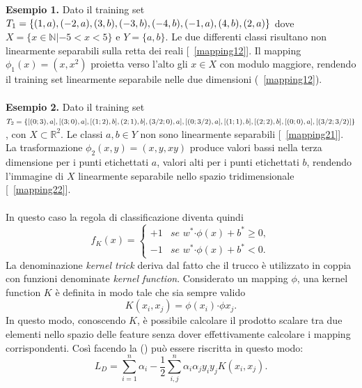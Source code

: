\documentclass [11pt,a4paper,twoside,openright] {book}
\begin{document}
\textbf{Esempio 1.} Dato il training set $T_1=\lbrace (1,a),(-2,a),(3,b),(-3,b),(-4,b), \linebreak (-1,a),(4,b),(2,a) \rbrace$ dove $X = \lbrace x \in \mathbb{N} | -5 < x < 5 \rbrace$ e $Y=\lbrace a,b \rbrace$. Le due differenti classi risultano non linearmente separabili sulla retta dei reali [\figurename~\ref{mapping12}]. Il mapping $\phi_1(x)=(x,x^2)$ proietta verso l'alto gli $x \in X$ con modulo maggiore, rendendo il training set linearmente separabile nelle due dimensioni (\figurename~\ref{mapping12}).\\\\
\textbf{Esempio 2.} Dato il training set $T_2=\lbrace [(0;3),a], [(3;0),a], [(1;2),b], (2;1),b], \linebreak (3/2;0),a], [(0;3/2),a], [(1;1),b], [(2;2),b], [(0;0),a], [(3/2; 3/2)] \rbrace$, con $X \subset \mathbb{R}^2$. Le classi $a, b \in Y$ non sono linearmente separabili [\figurename~\ref{mapping21}]. La trasformazione $\phi_2(x,y)=(x,y,xy)$ produce valori bassi nella terza dimensione per i punti etichettati $a$, valori alti per i punti etichettati $b$, rendendo l'immagine di $X$ linearmente separabile nello spazio tridimensionale [\figurename~\ref{mapping22}].\\\\
In questo caso la regola di classificazione diventa quindi
\begin{equation}
f_K(x)=
\begin{cases}
+1 & \textit{se } w^* \boldsymbol{\cdot} \phi(x) + b^* \geq 0, \\
-1 & \textit{se } w^* \boldsymbol{\cdot} \phi(x)  + b^*< 0.
\end{cases}
\end{equation}
La denominazione \textit{kernel trick} deriva dal fatto che il trucco è utilizzato in coppia con funzioni denominate \textit{kernel function}\cite{shawe2004kernel}. Considerato un mapping $\phi$, una kernel function $K$ è definita in modo tale che sia sempre valido
\begin{equation}
K(x_i,x_j) = \phi(x_i) \boldsymbol{\cdot} \phi{x_j}.
\end{equation}
In questo modo, conoscendo $K$, è possibile calcolare il prodotto scalare tra due elementi nello spazio delle feature senza dover effettivamente calcolare i mapping corrispondenti. Così facendo la () può essere riscritta in questo modo:
\begin{equation}
L_D = \sum_{i=1}^n \alpha_i -\dfrac{1}{2} \sum_{i,j}^n \alpha_i \alpha_j y_i y_j K(x_i,x_j).
\end{equation}
\end{document}
